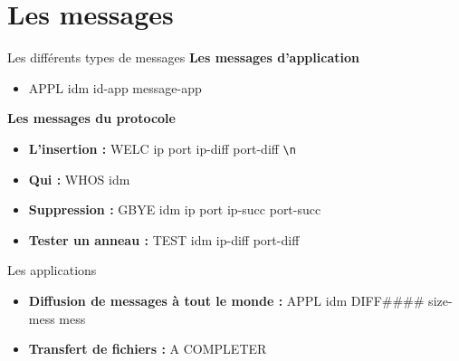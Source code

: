 \documentclass{beamer}
\newcommand*{\escape}[1]{\texttt{\textbackslash#1}}
\begin{document}
\section{Les messages}
\begin{frame}{Les différents types de messages}
	\textbf{Les messages d'application}
	\begin{itemize}
		 \item<2-9> APPL idm id-app message-app
	\end{itemize}
	\textbf{Les messages du protocole}
	\begin{itemize}
		 \item<3-9> \textbf{L'insertion :} WELC ip port ip-diff port-diff \escape{n}
 		 \item<4-9> \textbf{Qui :} WHOS idm
		 \item<5-9> \textbf{Suppression :} GBYE idm ip port ip-succ port-succ
		 \item<6-9> \textbf{Tester un anneau :} TEST idm ip-diff port-diff
	\end{itemize}
\end{frame}


\begin{frame}{Les applications}
	\begin{itemize}
		 \item<1-2> \textbf{Diffusion de messages à tout le monde :} APPL idm DIFF\#\#\#\# size-mess mess
 		 \item<2-2> \textbf{Transfert de fichiers :} A COMPLETER
	\end{itemize}
\end{frame}
\end{document}
